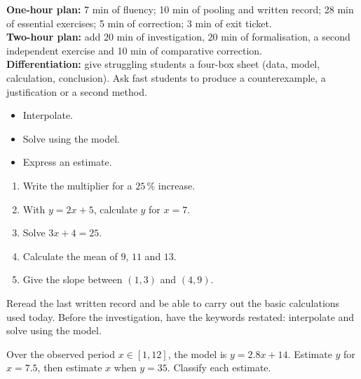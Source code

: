 \ifprof
\begin{methode}
\textbf{One-hour plan:} 7 min of fluency; 10 min of pooling and written record; 28 min of essential exercises; 5 min of correction; 3 min of exit ticket.\\
\textbf{Two-hour plan:} add 20 min of investigation, 20 min of formalisation, a second independent exercise and 10 min of comparative correction.\\
\textbf{Differentiation:} give struggling students a four-box sheet (data, model, calculation, conclusion). Ask fast students to produce a counterexample, a justification or a second method.
\end{methode}
\fi
{}
\begin{objectifs}\begin{itemize}\item Interpolate.\item Solve using the model.\item Express an estimate.\end{itemize}\end{objectifs}
\begin{automatismes}\begin{enumerate}\item Write the multiplier for a $25\,\%$ increase. \item With $y=2x+5$, calculate $y$ for $x=7$. \item Solve $3x+4=25$. \item Calculate the mean of $9$, $11$ and $13$. \item Give the slope between $(1,3)$ and $(4,9)$. \end{enumerate}\end{automatismes}
\begin{prerequis}Reread the last written record and be able to carry out the basic calculations used today. Before the investigation, have the keywords restated: interpolate and solve using the model.\end{prerequis}

\begin{activite}
Over the observed period $x\in[1,12]$, the model is $y=2.8x+14$. Estimate $y$ for $x=7.5$, then estimate $x$ when $y=35$. Classify each estimate.
\begin{center}\end{center}
\end{activite}

